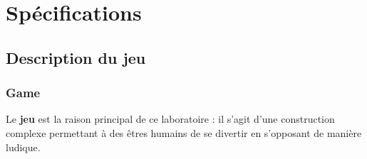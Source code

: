 \chapter*{Spécifications}
\renewcommand*{\theHsection}{chY.\the\value{section}}
\setcounter{chapter}{1}
\renewcommand{\thesection}{\arabic{section}}

\section{Description du jeu}

\subsection{Game}
Le \textbf{jeu} est la raison principal de ce laboratoire : il s'agit d'une construction complexe permettant à des êtres humains de se divertir en s'opposant de manière ludique.
    
